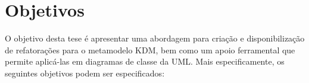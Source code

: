 



\section{Objetivos}\label{sec:objetivos}


O objetivo desta tese é apresentar uma abordagem para criação e disponibilização de refatorações para o metamodelo KDM, bem como um apoio ferramental que permite aplicá-las em diagramas de classe da UML. Mais especificamente, os seguintes objetivos podem ser especificados:%


